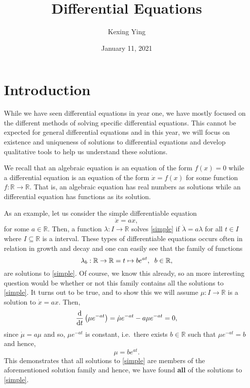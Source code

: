 \documentclass[
]{article}
\title{Differential Equations}
\author{Kexing Ying}
\date{January 11, 2021}
\theoremstyle{definition}
\theoremstyle{definition}
\begin{document}
\maketitle

{
\hypersetup{linkcolor=}
\setcounter{tocdepth}{2}
\tableofcontents
}
\newpage

\hypertarget{introduction}{%
\section{Introduction}\label{introduction}}

While we have seen differential equations in year one, we have mostly
focused on the different methods of solving specific differential
equations. This cannot be expected for general differential equations
and in this year, we will focus on existence and uniqueness of solutions
to differential equations and develop qualitative tools to help us
understand these solutions.

We recall that an algebraic equation is an equation of the form
\(f(x) = 0\) while a differential equation is an equation of the form
\(\dot x = f(x)\) for some function \(f : \mathbb{R} \to \mathbb{R}\).
That is, an algebraic equation has real numbers as solutions while an
differential equation has functions as its solution.

As an example, let us consider the simple differentiable equation
\begin{equation}\label{simple}
  \dot x = a x,
\end{equation} for some \(a \in \mathbb{R}\). Then, a function
\(\lambda : I \to \mathbb{R}\) solves \ref{simple} if
\(\dot \lambda = a \lambda\) for all \(t \in I\) where
\(I \subseteq \mathbb{R}\) is a interval. These types of differentiable
equations occurs often in relation in growth and decay and one can
easily see that the family of functions
\[\lambda_b : \mathbb{R} \to \mathbb{R} = t \mapsto b e^{at}, \hspace{2mm} b \in \mathbb{R},\]
are solutions to \ref{simple}. Of course, we know this already, so an
more interesting question would be whether or not this family contains
all the solutions to \ref{simple}. It turns out to be true, and to show
this we will assume \(\mu : I \to \mathbb{R}\) is a solution to
\(\dot x = a x\). Then,
\[\dv{t}\left(\mu e^{-at}\right) = \dot \mu e^{-at} - a\mu e^{-at} = 0,\]
since \(\dot \mu = a \mu\) and so, \(\mu e^{-at}\) is constant,
i.e.~there exists \(b \in \mathbb{R}\) such that \(\mu e^{-at} = b\) and
hence, \[\mu = b e^{at}.\] This demonstrates that all solutions to
\ref{simple} are members of the aforementioned solution family and
hence, we have found \textbf{all} of the solutions to \ref{simple}.
\end{document}
